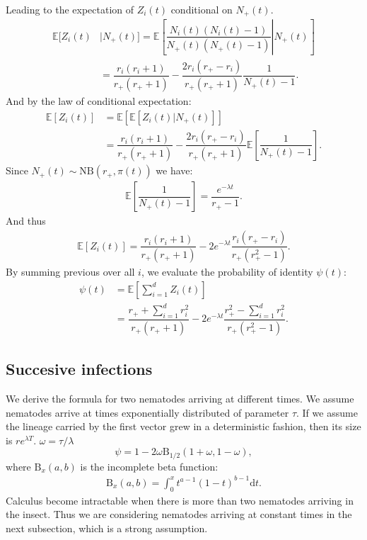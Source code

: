 \documentclass[10pt]{article}
\newcommand{\ud}{{\mathrm{d}}}
\begin{document}
\begin{boxframe}
\begin{multicols}{2}
\begin{align}
\end{align}
Leading to the expectation of $Z_i(t)$ conditional on $N_+(t)$.
\begin{align}
  \mathbb{E} [  Z_i(t)  & \vert N_+(t) ] = \mathbb{E}\left[ \left. \dfrac{N_i(t)(N_i(t)-1)}{N_+(t)( N_+(t)-1 ) }  \right\vert N_+(t) \right] \\
 &= \dfrac{r_i(r_i+1)}{r_+ (r_+ +1)}- \dfrac{2 r_i (r_+ -r_{i})}{r_+ (r_+ +1)} \dfrac{1}{ N_+(t) -1  }.
\end{align}
And by the law of conditional expectation:
\begin{align}
\mathbb{E}\left[ Z_i(t) \right] &= 
 \mathbb{E}\left[ \mathbb{E}\left[ \left. Z_i(t) \right\vert N_+(t) \right] \right]\\
 &=\dfrac{r_i(r_i+1)}{r_+ (r_+ +1 )}-\dfrac{2 r_i (r_+ -r_{i})}{r_+ (r_+ +1 )}\mathbb{E}\left[\dfrac{1}{N_+(t)-1} \right]. 
\end{align}
Since $N_+(t) \sim \mathrm{NB} (r_+, \pi(t))$ we have:
\begin{align}
\mathbb{E}\left[\dfrac{1}{N_+(t)-1} \right]=\dfrac{e^{-\lambda t}}{r_+-1}.
\end{align}
And thus 
\begin{align}
\mathbb{E}\left[ Z_i(t) \right] =\dfrac{r_i(r_i+1)}{r_+ (r_+ +1 )}-2e^{-\lambda t}\dfrac{ r_i (r_+ -r_{i})}{r_+ (r_+^2 -1 )}.
\end{align}
By summing previous over all $i$, we evaluate the probability of identity $\psi(t)$:
\begin{align}
\psi(t) &= \mathbb{E}[\sum_{i=1}^d Z_i(t)] \\
 &=\dfrac{ r_+ + \sum_{i=1}^d r_i^2}{r_+ (r_+ +1)}  -2 e^{-\lambda t} \dfrac{ r_+^2-\sum_{i=1}^d r_i^2}{r_+ (r_+^2 -1) }.
\end{align}
 \end{multicols}
\end{boxframe}
\begin{multicols}{2}

\subsection*{Succesive infections}

  We derive the formula for two nematodes arriving at different times. We assume nematodes arrive at times exponentially distributed of parameter $ \tau$. If we assume the lineage carried by the first vector grew in a deterministic fashion, then its size is $r e^{\lambda  T}$. $\omega=\tau / \lambda$
\begin{equation}
   \psi = 1- 2 \omega \mathrm{B}_{1/2}(1+\omega,1-\omega), \label{psi_consecutive}
\end{equation}
where $\mathrm{B}_x(a,b)$ is the incomplete beta function:
\begin{align}
\mathrm{B}_x(a,b) = \int_0^x t^{a-1}(1-t)^{b-1} \ud t.
\end{align}
Calculus become intractable when there is more than two nematodes arriving in the insect. Thus we are considering nematodes arriving at constant times in the next subsection, which is a strong assumption.


\end{multicols}
\end{document}
